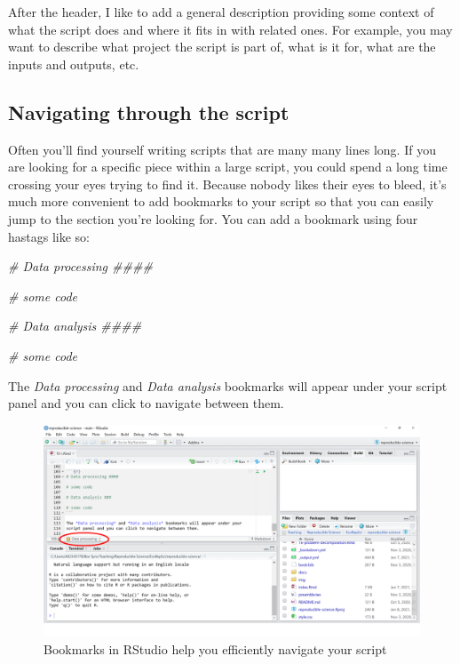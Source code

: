 \documentclass[
]{book}
\newenvironment{Shaded}{\begin{snugshade}}{\end{snugshade}}
\newcommand{\CommentTok}[1]{\textcolor[rgb]{0.56,0.35,0.01}{\textit{#1}}}
\begin{document}
After the header, I like to add a general description providing some context of
what the script does and where it fits in with related ones. For example, you
may want to describe what project the script is part of, what is it for, what
are the inputs and outputs, etc.

\hypertarget{navigating-through-the-script}{%
\subsection{Navigating through the script}\label{navigating-through-the-script}}

Often you'll find yourself writing scripts that are many many lines long. If you
are looking for a specific piece within a large script, you could spend a long
time crossing your eyes trying to find it. Because nobody likes their eyes to
bleed, it's much more convenient to add bookmarks to your script so that you can
easily jump to the section you're looking for. You can add a bookmark using four
hastags like so:

\begin{Shaded}
\begin{Highlighting}[]
\CommentTok{\# Data processing \#\#\#\#}

\CommentTok{\# some code}

\CommentTok{\# Data analysis \#\#\#\#}

\CommentTok{\# some code}
\end{Highlighting}
\end{Shaded}

The \emph{Data processing} and \emph{Data analysis} bookmarks will appear under your
script panel and you can click to navigate between them.

\begin{figure}

{\centering \includegraphics[width=0.8\linewidth]{img/rstudio-bookmarks} 

}

\caption{Bookmarks in RStudio help you efficiently navigate your script}\label{fig:r-bookmarks}
\end{figure}
\end{document}

